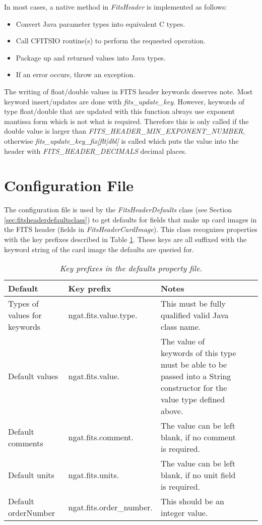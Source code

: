\documentclass[10pt,a4paper]{article}
\begin{document}
In most cases, a native method in {\em FitsHeader} is implemented as follows:
\begin{itemize}
\item Convert Java parameter types into equivalent C types.
\item Call CFITSIO routine(s) to perform the requested operation.
\item Package up and returned values into Java types.
\item If an error occurs, throw an exception.
\end{itemize}

The writing of float/double values in FITS header keywords deserves note. Most keyword insert/updates are done
with {\em fits\_update\_key}. However, keywords of type float/double that are updated with this function
always use exponent mantissa form which is not what is required. Therefore this is only called if
the double value is larger than {\em FITS\_HEADER\_MIN\_EXPONENT\_NUMBER}, otherwise 
{\em fits\_update\_key\_fix[flt|dbl]} is called which puts the value into the header with {\em FITS\_HEADER\_DECIMALS}
decimal places.

\section{Configuration File}
\label{sec:configfile}
The configuration file is used by the {\em FitsHeaderDefaults} class (see Section \ref{sec:fitsheaderdefaultsclass}) 
to get defaults for fields that make up card images in the FITS header (fields in {\em FitsHeaderCardImage}).
This class recognizes properties with the key prefixes described in Table \ref{tab:defaultkeyprefix}.
These keys are all suffixed with the keyword string of the card image the defaults are queried for.

\begin{table}
\begin{center}
\begin{tabular}{|l|l|p{12em}|l|p{17em}|}
\hline
{\bf Default} 			& {\bf Key prefix} 	& {\bf Notes} \\ \hline
Types of values for keywords	& ngat.fits.value.type. & This must be fully qualified valid Java class name. \\ \hline
Default values 			& ngat.fits.value. 	& The value of keywords of this type must be able to be 
					passed into a String constructor for the value type defined above. \\ \hline
Default comments 		& ngat.fits.comment. 	& The value can be left blank, 
							if no comment is required. \\ \hline
Default units 			& ngat.fits.units. 	& The value can be left blank, 
							if no unit field is required. \\ \hline
Default orderNumber 		& ngat.fits.order\_number. & This should be an integer value. \\ \hline
\end{tabular}
\end{center}
\caption{\em Key prefixes in the defaults property file.}
\label{tab:defaultkeyprefix} 
\end{table}
\end{document}
